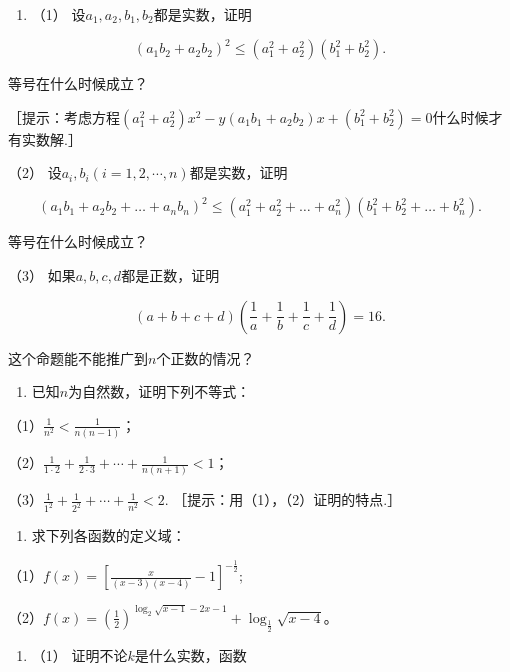 \begin{enumerate}[start=7]
\item
  （1） 设\(a_{1}, a_{2}, b_{1}, b_{2}\)都是实数，证明
\end{enumerate}

\[
(a_{1} b_{2} + a_{2} b_{2})^{2} \leqslant (a_{1}^{2} + a_{2}^{2}) (b_{1}^{2} + b_{2}^{2}).
\]

等号在什么时候成立？

［提示：考虑方程\((a_{1}^{2} + a_{2}^{2})x^{2} - y(a_{1}b_{1} + a_{2}b_{2})x + (b_{1}^{2} + b_{2}^{2}) = 0\)什么时候才有实数解.］

（2） 设\(a_{i}, b_{i} (i = 1, 2, \cdots, n)\)都是实数，证明

\[
(a_{1} b_{1} + a_{2} b_{2} + \dots + a_{n} b_{n})^{2} \leqslant (a_{1}^{2} + a_{2}^{2} + \dots + a_{n}^{2}) (b_{1}^{2} + b_{2}^{2} + \dots + b_{n}^{2}).
\]

等号在什么时候成立？

（3） 如果\(a, b, c, d\)都是正数，证明

\[
(a + b + c + d) \left(\frac{1}{a} + \frac{1}{b} + \frac{1}{c} + \frac{1}{d}\right) = 16.
\]

这个命题能不能推广到\(n\)个正数的情况？

\begin{enumerate}[start=8]
\item
  已知\(n\)为自然数，证明下列不等式：
\end{enumerate}

（1）\(\frac{1}{n^2} < \frac{1}{n(n - 1)}\)；

（2）\(\frac{1}{1 \cdot 2} + \frac{1}{2 \cdot 3} + \cdots + \frac{1}{n(n + 1)} < 1\)；

（3）\(\frac{1}{1^2} + \frac{1}{2^2} + \cdots + \frac{1}{n^2} < 2.\)
［提示：用（1），（2）证明的特点.］

\begin{enumerate}[start=9]
\item
  求下列各函数的定义域：
\end{enumerate}

（1）\(f(x) = \left[\frac{x}{(x - 3)(x - 4)} - 1\right]^{-\frac{1}{2}};\)

（2）\(f(x) = \left(\frac{1}{2}\right)^{\log_2\sqrt{x - 1} - 2x - 1} + \log_{\frac{1}{2}}\sqrt{x - 4}\)。

\begin{enumerate}[start=10]
\item
  （1） 证明不论\(k\)是什么实数，函数
\end{enumerate}

